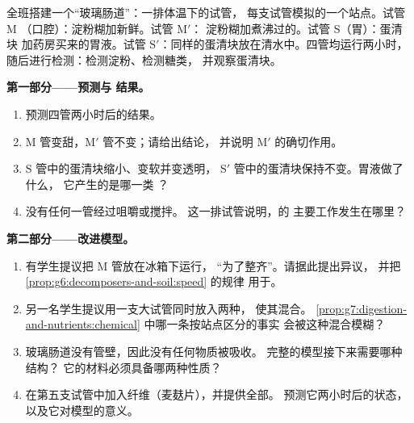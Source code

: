 \begin{problem}\label{pb:g7:digestion-and-nutrients:1}
全班搭建一个“玻璃肠道”：一排体温下的试管，
每支试管模拟的一个站点。试管 M
（口腔）：淀粉糊加新鲜。试管 M$'$：
淀粉糊加煮沸过的。试管 S（胃）：蛋清块
加药房买来的胃液。试管
S$'$：同样的蛋清块放在清水中。四管均运行两小时，
随后进行检测：检测淀粉、检测糖类，
并观察蛋清块。

\medskip\noindent\textbf{第一部分——预测与
结果。}
\begin{enumerate}
  \item 预测四管两小时后的结果。
  \item M 管变甜，M$'$ 管不变；请给出结论，
        并说明 M$'$ 的确切作用。
  \item S 管中的蛋清块缩小、变软并变透明，
        S$'$ 管中的蛋清块保持不变。胃液做了什么，
        它产生的是哪一类
        ？
  \item 没有任何一管经过咀嚼或搅拌。
        这一排试管说明，的
        主要工作发生在哪里？
\end{enumerate}

\medskip\noindent\textbf{第二部分——改进模型。}
\begin{enumerate}[resume]
  \item 有学生提议把 M 管放在冰箱下运行，
        “为了整齐”。请据此提出异议，
        并把 \cref{prop:g6:decomposers-and-soil:speed} 的规律
        用于。
  \item 另一名学生提议用一支大试管同时放入两种，
        使其混合。
        \cref{prop:g7:digestion-and-nutrients:chemical} 中哪一条按站点区分的事实
        会被这种混合模糊？
  \item 玻璃肠道没有管壁，因此没有任何物质被吸收。
        完整的模型接下来需要哪种结构？
        它的材料必须具备哪两种性质？
  \item 在第五支试管中加入纤维（麦麸片），并提供全部。
        预测它两小时后的状态，
        以及它对模型的意义。
\end{enumerate}


\end{problem}
